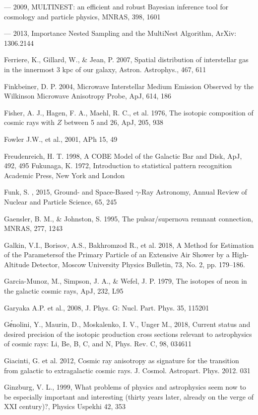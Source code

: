 --- 2009, MULTINEST: an efficient and robust Bayesian inference tool for cosmology and particle physics, MNRAS, 398, 1601

--- 2013, Importance Nested Sampling and the MultiNest Algorithm, ArXiv: 1306.2144

Ferriere, K., Gillard, W., \& Jean, P. 2007, Spatial distribution of interstellar gas in the innermost 3 kpc of our galaxy, Astron. Astrophys., 467, 611

Finkbeiner, D. P. 2004, Microwave Interstellar Medium Emission Observed by the Wilkinson Microwave Anisotropy Probe, ApJ, 614, 186

Fisher, A. J., Hagen, F. A., Maehl, R. C., et al. 1976, The isotopic composition of cosmic rays with $Z$ between 5 and 26, ApJ, 205, 938

Fowler J.W., et al., 2001, APh 15, 49

Freudenreich, H. T. 1998, A COBE Model of the Galactic Bar and Disk, ApJ, 492, 495 Fukunaga, K. 1972, Introduction to statistical pattern recognition Academic Press, New York and London

Funk, S. , 2015, Ground- and Space-Based $\gamma$-Ray Astronomy, Annual Review of Nuclear and Particle Science, 65, 245

Gaensler, B. M., \& Johnston, S. 1995, The pulsar/supernova remnant connection, MNRAS, 277, 1243

Galkin, V.I., Borisov, A.S., Bakhromzod R., et al. 2018, A Method for Estimation of the Parametersof the Primary Particle of an Extensive Air Shower by a High-Altitude Detector, Moscow University Physics Bulletin, 73, No. 2, pp. 179--186.

Garcia-Munoz, M., Simpson, J. A., \& Wefel, J. P. 1979, The isotopes of neon in the galactic cosmic rays, ApJ, 232, L95

Garyaka A.P. et al., 2008, J. Phys. G: Nucl. Part. Phys. 35, 115201

G\'еnolini, Y., Maurin, D., Moskalenko, I. V., Unger M., 2018, Current status and desired precision of the isotopic production cross sections relevant to astrophysics of cosmic rays: Li, Be, B, C, and N, Phys. Rev. C, 98, 034611

Giacinti, G. et al. 2012, Cosmic ray anisotropy as signature for the transition from galactic to extragalactic cosmic rays. J. Cosmol. Astropart. Phys. 2012. 031

Ginzburg, V. L., 1999, What problems of physics and astrophysics seem now to be especially important and interesting (thirty years later, already on the verge of XXI century)?, Physics Uspekhi 42, 353

